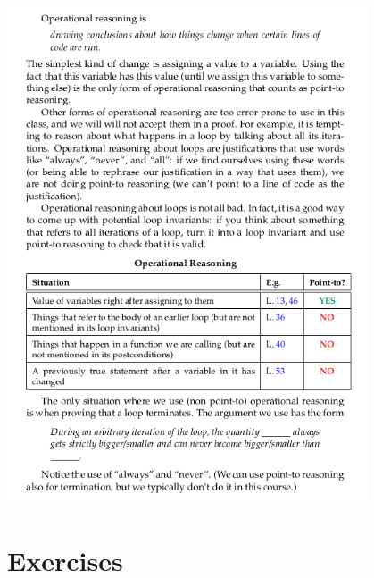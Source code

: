 \begin{center}
  \includegraphics[width=0.8\textwidth]{img/reasoning4.png}
\end{center}


\clearpage
\section{Exercises}
\label{sec:contracts:exercises}


